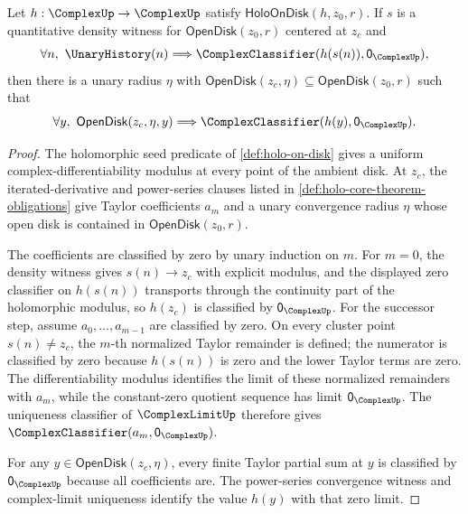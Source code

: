 \begin{lemma}
\label{lem:holo-cluster-zeros-local-zero-classifier}
Let $h:\ComplexUp\to\ComplexUp$ satisfy $\mathsf{HoloOnDisk}(h,z_0,r)$. If $s$ is a quantitative density witness for $\mathsf{OpenDisk}(z_0,r)$ centered at $z_c$ and
$$
\forall n,\ \UnaryHistory(n)\Longrightarrow \ComplexClassifier(h(s(n)),\mathsf{0}_{\ComplexUp}),
$$
then there is a unary radius $\eta$ with $\mathsf{OpenDisk}(z_c,\eta)\subseteq\mathsf{OpenDisk}(z_0,r)$ such that
$$
\forall y,\ \mathsf{OpenDisk}(z_c,\eta,y)\Longrightarrow \ComplexClassifier(h(y),\mathsf{0}_{\ComplexUp}).
$$
\end{lemma}
\begin{proof}
The holomorphic seed predicate of \autoref{def:holo-on-disk} gives a uniform complex-differentiability modulus at every point of the ambient disk. At $z_c$, the iterated-derivative and power-series clauses listed in \autoref{def:holo-core-theorem-obligations} give Taylor coefficients $a_m$ and a unary convergence radius $\eta$ whose open disk is contained in $\mathsf{OpenDisk}(z_0,r)$.

The coefficients are classified by zero by unary induction on $m$. For $m=0$, the density witness gives $s(n)\to z_c$ with explicit modulus, and the displayed zero classifier on $h(s(n))$ transports through the continuity part of the holomorphic modulus, so $h(z_c)$ is classified by $\mathsf{0}_{\ComplexUp}$. For the successor step, assume $a_0,\ldots,a_{m-1}$ are classified by zero. On every cluster point $s(n)\neq z_c$, the $m$-th normalized Taylor remainder is defined; the numerator is classified by zero because $h(s(n))$ is zero and the lower Taylor terms are zero. The differentiability modulus identifies the limit of these normalized remainders with $a_m$, while the constant-zero quotient sequence has limit $\mathsf{0}_{\ComplexUp}$. The uniqueness classifier of $\ComplexLimitUp$ therefore gives $\ComplexClassifier(a_m,\mathsf{0}_{\ComplexUp})$.

For any $y\in\mathsf{OpenDisk}(z_c,\eta)$, every finite Taylor partial sum at $y$ is classified by $\mathsf{0}_{\ComplexUp}$ because all coefficients are. The power-series convergence witness and complex-limit uniqueness identify the value $h(y)$ with that zero limit.
\end{proof}


